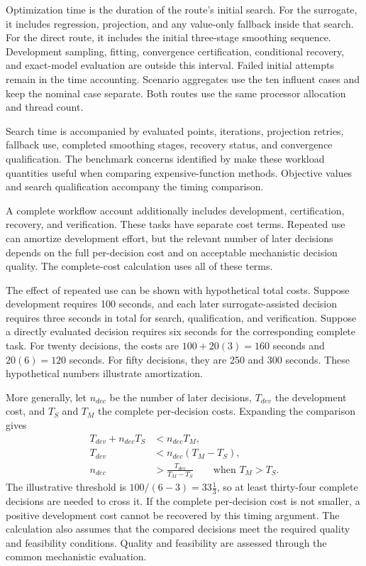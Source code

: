 Optimization time is the duration of the route's initial search. For the surrogate, it includes regression, projection, and any value-only fallback inside that search. For the direct route, it includes the initial three-stage smoothing sequence. Development sampling, fitting, convergence certification, conditional recovery, and exact-model evaluation are outside this interval. Failed initial attempts remain in the time accounting. Scenario aggregates use the ten influent cases and keep the nominal case separate. Both routes use the same processor allocation and thread count.

Search time is accompanied by evaluated points, iterations, projection retries, fallback use, completed smoothing stages, recovery status, and convergence qualification. The benchmark concerns identified by \citet{Bliek2023} make these workload quantities useful when comparing expensive-function methods. Objective values and search qualification accompany the timing comparison.

A complete workflow account additionally includes development, certification, recovery, and verification. These tasks have separate cost terms. Repeated use can amortize development effort, but the relevant number of later decisions depends on the full per-decision cost and on acceptable mechanistic decision quality. The complete-cost calculation uses all of these terms.

The effect of repeated use can be shown with hypothetical total costs. Suppose development requires 100 seconds, and each later surrogate-assisted decision requires three seconds in total for search, qualification, and verification. Suppose a directly evaluated decision requires six seconds for the corresponding complete task. For twenty decisions, the costs are $100+20(3)=160$ seconds and $20(6)=120$ seconds. For fifty decisions, they are 250 and 300 seconds. These hypothetical numbers illustrate amortization.

More generally, let $n_{dec}$ be the number of later decisions, $T_{dev}$ the development cost, and $T_S$ and $T_M$ the complete per-decision costs. Expanding the comparison gives
\[
\begin{aligned}
T_{dev}+n_{dec}T_S&<n_{dec}T_M,\\
T_{dev}&<n_{dec}(T_M-T_S),\\
n_{dec}&>\frac{T_{dev}}{T_M-T_S}\qquad\text{when }T_M>T_S.
\end{aligned}
\]
The illustrative threshold is $100/(6-3)=33\tfrac13$, so at least thirty-four complete decisions are needed to cross it. If the complete per-decision cost is not smaller, a positive development cost cannot be recovered by this timing argument. The calculation also assumes that the compared decisions meet the required quality and feasibility conditions. Quality and feasibility are assessed through the common mechanistic evaluation.

